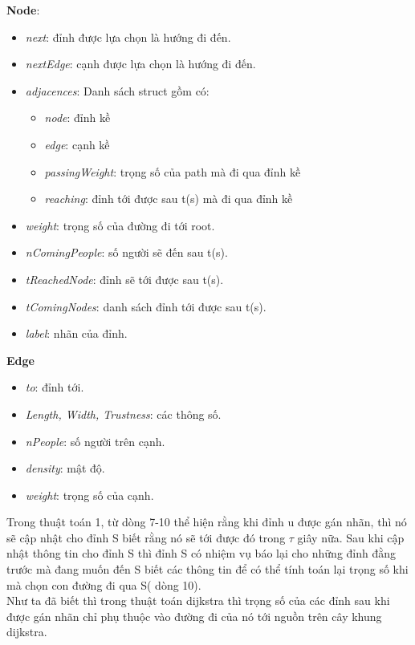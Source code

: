     \textbf{Node}: 
    \begin{itemize}
        \item \textit{next}: đỉnh được lựa chọn là hướng đi đến.
        \item \textit{nextEdge}: cạnh được lựa chọn là hướng đi đến.
        \item \textit{adjacences}: Danh sách struct gồm có:
        \begin{itemize}
            \item \textit{node}: đỉnh kề
            \item \textit{edge}: cạnh kề
            \item \textit{passingWeight}: trọng số của path mà đi qua đỉnh kề 
            \item \textit{reaching}: đỉnh tới được sau t(s) mà đi qua đỉnh 
            kề
        \end{itemize}    
        \item \textit{weight}: trọng số của đường đi tới root.
        \item \textit{nComingPeople}: số người sẽ đến sau t(s).
        \item \textit{tReachedNode}: đỉnh sẽ tới được sau t(s).
        \item \textit{tComingNodes}: danh sách đỉnh tới được sau t(s).
        \item \textit{label}: nhãn của đỉnh.
    \end{itemize}
    \textbf{Edge}
    \begin{itemize}
        \item \textit{to}: đỉnh tới.
        \item \textit{Length, Width, Trustness}: các thông số.
        \item \textit{nPeople}: số người trên cạnh.
        \item \textit{density}: mật độ.
        \item \textit{weight}: trọng số của cạnh.
    \end{itemize}
    Trong thuật toán 1, từ dòng 7-10 thể hiện rằng khi đỉnh u được gán nhãn, thì nó 
    sẽ cập nhật cho đỉnh S biết rằng nó sẽ tới được đó trong $\tau$ giây nữa. Sau khi 
    cập nhật thông tin cho đỉnh S thì đỉnh S có nhiệm vụ báo lại cho những đỉnh đằng 
    trước mà đang muốn đến S biết các thông tin để có thể tính toán lại trọng số khi 
    mà chọn con đường đi qua S( dòng 10). \\ 
    Như ta đã biết thì trong thuật toán dijkstra thì trọng số của các đỉnh sau khi 
    được gán nhãn chỉ phụ thuộc vào đường đi của nó tới nguồn trên cây khung dijkstra.
